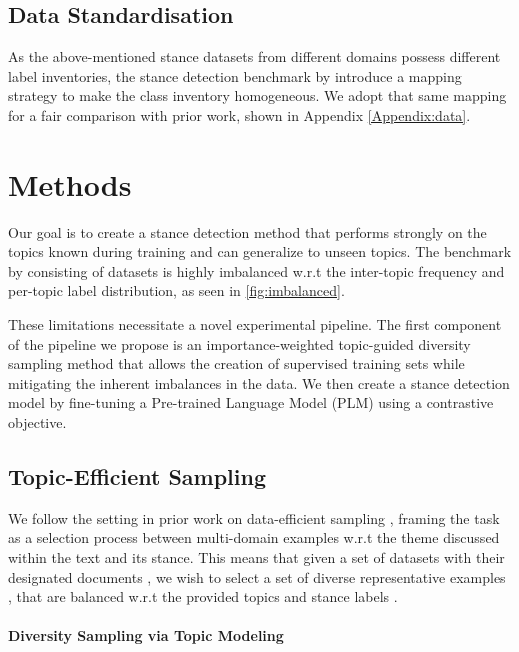 \documentclass[11pt]{article}
\begin{document}
\subsection{Data Standardisation}

As the above-mentioned stance datasets from different domains possess different label inventories, the stance detection benchmark by \citet{hardalov2021cross} introduce a mapping strategy to make the class inventory homogeneous. We adopt that same mapping for a fair comparison with prior work, shown in Appendix \ref{Appendix:data}.


\section{Methods}

Our goal is to create a stance detection method that performs strongly on the topics known during training and can generalize to unseen topics. The benchmark by \citet{hardalov2021cross} consisting of  datasets is highly imbalanced w.r.t the inter-topic frequency and per-topic label distribution, as seen in \autoref{fig:imbalanced}. 

These limitations necessitate a novel experimental pipeline. The first component of the pipeline we propose is an importance-weighted topic-guided diversity sampling method that allows the creation of supervised training sets while mitigating the inherent imbalances in the data. We then create a stance detection model by fine-tuning a Pre-trained Language Model (PLM) using a contrastive objective.



\label{sec:methods}




\subsection{Topic-Efficient Sampling}
\label{sec:methods:topic}


We follow the setting in prior work on data-efficient sampling \cite{buchert2022exploiting,yan2022mitigating}, framing the task as a selection process between multi-domain examples w.r.t the theme discussed within the text and its stance. This means that given a set of datasets  with their designated documents , we wish to select a set of diverse representative examples , that are balanced w.r.t the provided topics  and stance labels . 



\paragraph{Diversity Sampling via Topic Modeling}
\end{document}
